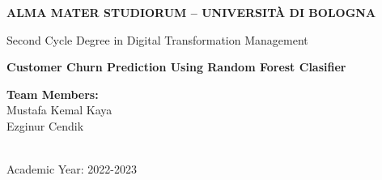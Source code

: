 \begin{titlepage}

	\begin{center}
		\textbf{ALMA MATER STUDIORUM -- UNIVERSITÀ DI BOLOGNA}
		\\
		\noindent\hrulefill
		\vspace{0.4cm}

        \large
		Second Cycle Degree in Digital Transformation Management
		
		\Huge
		\vspace{4cm}
		\textbf{Customer Churn Prediction Using Random Forest Clasifier}\\ 
		
		\large		
		\vspace{5.5cm}
		\begin{minipage}[t]{0.64\textwidth}
			\begin{flushleft}
                \vspace{0.2cm}
				
			\end{flushleft}
		\end{minipage}
		\begin{minipage}[t]{0.34\textwidth}
			\begin{flushright}
				\textbf{Team Members:} \\
				\vspace{0.2cm}
                Mustafa Kemal Kaya\\ 
                Ezginur Cendik
			\end{flushright}
		\end{minipage}


		\vfill
		\noindent\hrulefill
		\vspace{0.3cm}
		\large
        \\
		Academic Year: 2022-2023
  
	\end{center}
 
\end{titlepage}
